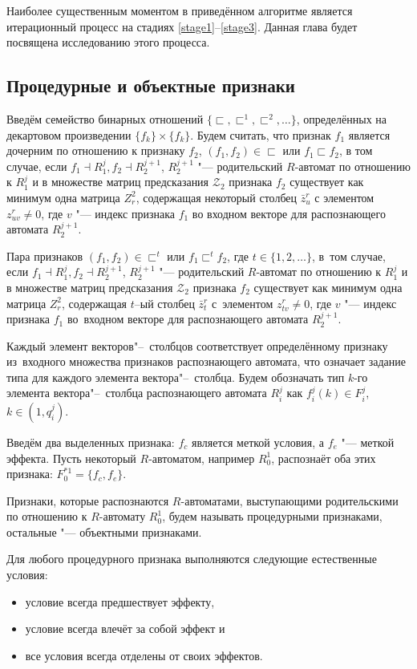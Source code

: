 Наиболее существенным моментом в приведённом алгоритме является итерационный процесс на стадиях \ref{stage1}--\ref{stage3}. Данная глава будет посвящена исследованию этого процесса.

\subsection{Процедурные и объектные признаки}

Введём семейство бинарных отношений $\{\sqsubset,\sqsubset^1,\sqsubset^2,\dots\}$, определённых на декартовом произведении $\{f_k\}\times \{f_k\}$. Будем считать, что признак $f_1$ является дочерним по отношению к признаку $f_2$, $(f_1,f_2 )\in\sqsubset$ или $f_1\sqsubset f_2$, в том случае, если $f_1\dashv R_1^j, f_2\dashv R_2^{j+1}$, $R_2^{j+1}$ "--- родительский $R$-автомат по отношению к $R_1^j$ и в множестве матриц предсказания $\mathcal Z_2$ признака $f_2$ существует как минимум одна матрица $Z_r^2$, содержащая некоторый столбец $\bar z_u^r$ с элементом $z_{uv}^r\not=0$, где $v$ "--- индекс признака $f_1$ во входном векторе для распознающего автомата $R_2^{j+1}$.

Пара признаков $(f_1,f_2)\in\sqsubset^t$ или $f_1\sqsubset^t f_2$, где $t\in\{1,2,\dots\}$, в~том случае, если $f_1\dashv R_1^j, f_2\dashv R_2^{j+1}$, $R_2^{j+1}$ "--- родительский $R$-автомат по отношению к $R_1^j$ и в множестве матриц предсказания $\mathcal Z_2$ признака $f_2$ существует как минимум одна матрица $Z_r^2$, содержащая $t$–ый столбец $\bar z_t^r$ с~элементом $z_{tv}^r\not=0$, где $v$ "--- индекс признака $f_1$ во~входном векторе для распознающего автомата $R_2^{j+1}$.

Каждый элемент векторов"--~столбцов соответствует определённому признаку из~входного множества признаков распознающего автомата, что означает задание типа для каждого элемента вектора"--~столбца. Будем обозначать тип $k$-го элемента вектора"--~столбца распознающего автомата $R_i^j$ как $f_i^j(k)\in F_i^j$, $k\in(1,q_i^j)$. 

Введём два выделенных признака: $f_c$ является меткой условия, а $f_e$ "--- меткой эффекта. Пусть некоторый $R$-автоматом, например $R_0^1$, распознаёт оба этих признака: $F_0^{*1}=\{f_c,f_e\}$.
\begin{Def}
	Признаки, которые распознаются $R$-автоматами, выступающими родительскими по отношению к $R$-автомату $R_0^1$, будем называть процедурными признаками, остальные "--- объектными признаками.
\end{Def}
Для любого процедурного признака выполняются следующие естественные условия:
\begin{itemize}
	\item условие всегда предшествует эффекту,
	\item условие всегда влечёт за собой эффект и
	\item все условия всегда отделены от своих эффектов.
\end{itemize}

